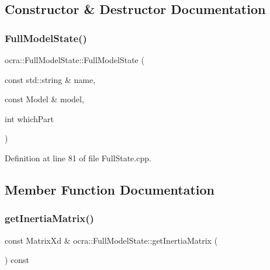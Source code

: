 \subsection{Constructor \& Destructor Documentation}
\hypertarget{classocra_1_1FullModelState_a2fc326508bd940f338c614c18549a7ba}{}\label{classocra_1_1FullModelState_a2fc326508bd940f338c614c18549a7ba} 
\subsubsection{\texorpdfstring{Full\+Model\+State()}{FullModelState()}}
{\footnotesize\ttfamily ocra\+::\+Full\+Model\+State\+::\+Full\+Model\+State (\begin{DoxyParamCaption}\item[{const std\+::string \&}]{name,  }\item[{const Model \&}]{model,  }\item[{int}]{which\+Part }\end{DoxyParamCaption})}



Definition at line 81 of file Full\+State.\+cpp.



\subsection{Member Function Documentation}
\hypertarget{classocra_1_1FullModelState_a988dec9567fd2b083ecfb6f3348d9a09}{}\label{classocra_1_1FullModelState_a988dec9567fd2b083ecfb6f3348d9a09} 
\subsubsection{\texorpdfstring{get\+Inertia\+Matrix()}{getInertiaMatrix()}}
{\footnotesize\ttfamily const Matrix\+Xd \& ocra\+::\+Full\+Model\+State\+::get\+Inertia\+Matrix (\begin{DoxyParamCaption}{ }\end{DoxyParamCaption}) const\hspace{0.3cm}{\ttfamily [virtual]}}



